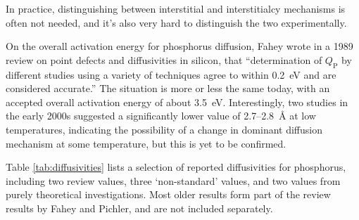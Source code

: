 \documentclass[11pt,bibliography=totoc,index=totoc]{scrbook}   %
\begin{document}
In practice, distinguishing between interstitial and interstitialcy mechanisms is often not needed, 
and it's also very hard to distinguish the two experimentally.\cite[295]{Fahey:1989}



On the overall activation energy for phosphorus diffusion, Fahey wrote in a 1989 review on point defects and diffusivities in silicon, 
that ``determination of $Q_{\text{P}}$ by different studies using a variety of techniques agree to within 0.2~eV and are considered accurate.''\cite{Fahey:1989}
The situation is more or less the same today, with an accepted overall activation energy of about 3.5~eV.\cite{Pichler:2004}
Interestingly, two studies in the early 2000s suggested a significantly lower value of 2.7--2.8~Å at low temperatures,\cite{Haddara:2000}\cite{Christensen:2003}
indicating the possibility of a change in dominant diffusion mechanism at some temperature, but this is yet to be confirmed.

Table \ref{tab:diffusivities} lists a selection of reported diffusivities for phosphorus,
including two review values, three `non-standard' values, and two values from purely theoretical investigations.
Most older results form part of the review results by Fahey\cite{Fahey:1989} and Pichler,\cite{Pichler:2004}
and are not included separately.
\end{document}

